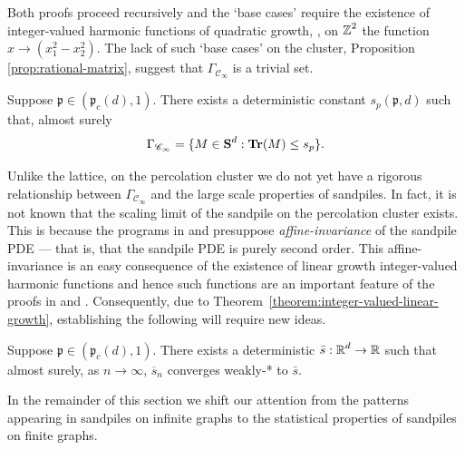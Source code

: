 \documentclass[12pt]{amsart}
\numberwithin{equation}{section}
\begin{document}
	Both proofs \cite{apollonian-matrix,bou2021integer} proceed recursively
	and the `base cases' require the existence of integer-valued harmonic functions of quadratic growth, \eg, on $\operatorname{\mathbb{Z}}^2$ the function $x \to (x_1^2 - x_2^2)$. 
	The lack of such `base cases' on the cluster, Proposition \ref{prop:rational-matrix}, suggest that $\Gamma_{\mathscr{C}_{\infty}}$ is a trivial set. 
	\begin{conj} \label{conj:sandpile-percolation}
		Suppose $\mathfrak{p} \in (\mathfrak{p}_c(d), 1)$.
		There exists a deterministic constant $s_p(\mathfrak{p}, d)$ such that, almost surely
		\[
		\Gamma_{\mathscr{C}_{\infty}} = \{ M \in \operatorname{{\mbox{\bf S}}}^d : \operatorname{\mathop{\bf Tr}}(M) \leq s_p \}. 
		\]
	\end{conj}
	Unlike the lattice, on the percolation cluster we do not yet have a rigorous relationship between $\Gamma_{\mathscr{C}_{\infty}}$ and the large scale properties of sandpiles.
	In fact, it is not known that the scaling limit of the sandpile on the percolation cluster exists. This is because the programs   
	in \cite{pegden-smart-sandpile-2013} and \cite{bourabee-sandpile-2021} presuppose {\it affine-invariance} of the sandpile PDE --- that is, that the sandpile PDE is purely second order. This affine-invariance is an easy consequence of the existence of linear growth integer-valued harmonic functions and hence such functions are an important feature of the proofs in \cite{pegden-smart-sandpile-2013} and \cite{bourabee-sandpile-2021}.
	Consequently, due to Theorem~\ref{theorem:integer-valued-linear-growth}, establishing the following will require new ideas. 
	\begin{conj} \label{conj:sandpile-limit-shape-exists}
		Suppose $\mathfrak{p} \in (\mathfrak{p}_c(d), 1)$. There exists a deterministic $\bar{s}: \operatorname{\mathbb{R}}^d \to \operatorname{\mathbb{R}}$ such that almost surely, as $n \to \infty$, $\overline{s}_n$ converges weakly-* to $\bar{s}$.
	\end{conj}
	In the remainder of this section we shift our attention from the patterns appearing in sandpiles on infinite graphs to the statistical properties 
	of sandpiles on finite graphs. 
	
\end{document}
